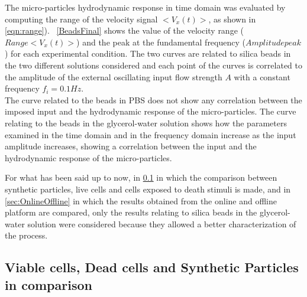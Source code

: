 \documentclass[journal]{IEEEtran}
\theoremstyle{definition}
\theoremstyle{remark}
\begin{document}
The micro-particles hydrodynamic response in time domain was evaluated by computing the range of the velocity signal $<V_x(t)>$, as shown in \DS{\eqn(}\ref{eqn:range}). ~\fig\ref{BeadsFinal} shows the value of the velocity range ($Range<V_x(t)>$) and the peak at the fundamental frequency ($Amplitude peak$ ) for each experimental condition. The two curves are related to silica beads in the two different solutions considered and each point of the curves is correlated to the amplitude of the external oscillating input flow strength $A$ with a constant frequency $f_i= 0.1 Hz$. 
\\The curve related to the beads in PBS does not show any correlation between the imposed input and the hydrodynamic response of the micro-particles. The curve relating to the beads in the glycerol-water solution shows how the parameters examined in the time domain and in the frequency domain increase as the input amplitude increases, showing a correlation between the input and the hydrodynamic response of the micro-particles.

For what has been said up to now, in \sect\ref{sec:comparison} in which the comparison between synthetic particles, live cells and cells exposed to death stimuli is made, and in \sect\ref{sec:OnlineOffline} in which the results obtained from the online and offline platform are compared, only the results relating to silica beads in the glycerol-water solution were considered because they allowed a better characterization of the process.

\subsection{Viable cells, Dead cells and Synthetic Particles in comparison}\label{sec:comparison}
\end{document}
